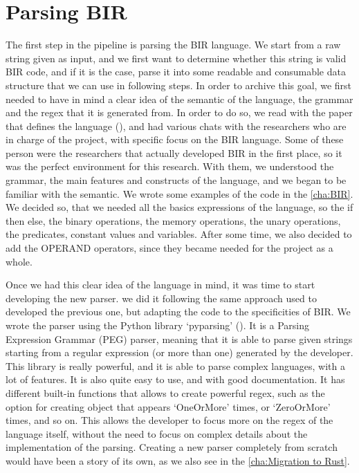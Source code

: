 \section{Parsing BIR}
\label{cha:Parsing BIR} The first step in the pipeline is parsing the BIR
language. We start from a raw string given as input, and we first want to
determine whether this string is valid BIR code, and if it is the case, parse it
into some readable and consumable data structure that we can use in following
steps. In order to archive this goal, we first needed to have in mind a clear
idea of the semantic of the language, the grammar and the regex that it is generated
from. In order to do so, we read with the paper that defines the language (\cite{bir_pub}),
and had various chats with the researchers who are in charge of the project, with
specific focus on the BIR language. Some of these person were the researchers
that actually developed BIR in the first place, so it was the perfect environment
for this research. With them, we understood the grammar, the main features and
constructs of the language, and we began to be familiar with the semantic. We
wrote some examples of the code in the \cref{cha:BIR}. We decided so, that we
needed all the basics expressions of the language, so the if then else, the
binary operations, the memory operations, the unary operations, the predicates,
constant values and variables. After some time, we also decided to add the
OPERAND operators, since they became needed for the project as a whole.

Once we had this clear idea of the language in mind, it was time to start
developing the new parser. we did it following the same approach used to developed
the previous one, but adapting the code to the specificities of BIR. We wrote the
parser using the Python library `pyparsing' (\cite{pyparsing}). It is a Parsing
Expression Grammar (PEG) parser, meaning that it is able to parse given strings starting
from a regular expression (or more than one) generated by the developer. This
library is really powerful, and it is able to parse complex languages, with a
lot of features. It is also quite easy to use, and with good documentation. It has
different built-in functions that allows to create powerful regex, such as the
option for creating object that appears `OneOrMore' times, or `ZeroOrMore' times,
and so on. This allows the developer to focus more on the regex of the language itself,
without the need to focus on complex details about the implementation of the
parsing. Creating a new parser completely from scratch would have been a story of
its own, as we also see in the \cref{cha:Migration to Rust}.

